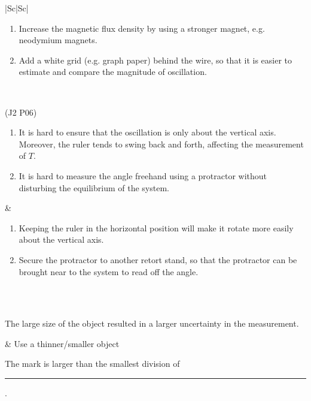 \documentclass[oneside]{book}
\begin{document}
\begin{itemize}
\begin{longtable}{|Sc|Sc|}
\begin{minipage}{0.5\textwidth-25.2pt}
            \begin{enumerate}
                \item Increase the magnetic flux density by using a stronger magnet, e.g. neodymium magnets.
                \item Add a white grid (e.g. graph paper) behind the wire, so that it is easier to estimate and compare the magnitude of oscillation.
            \end{enumerate}
        \end{minipage}\\
        \hline
        \begin{minipage}{0.5\textwidth-25.2pt}
            (J2 P06)
            \begin{enumerate}
                \item It is hard to ensure that the oscillation is only about the vertical axis. Moreover, the ruler tends to swing back and forth, affecting the measurement of \(T\).
                \item It is hard to measure the angle freehand using a protractor without disturbing the equilibrium of the system.
            \end{enumerate}
        \end{minipage}&
        \begin{minipage}{0.5\textwidth-25.2pt}
            \begin{enumerate}
                \item Keeping the ruler in the horizontal position will make it rotate more easily about the vertical axis.
                \item Secure the protractor to another retort stand, so that the protractor can be brought near to the system to read off the angle.
            \end{enumerate}
        \end{minipage}\\
        \hline
        \hline
        \\
        \hline
        \begin{minipage}{0.5\textwidth-25.2pt}
            The large size of the object resulted in a larger uncertainty in the measurement.
        \end{minipage}& 
        Use a thinner/smaller object\\
        \hline
        \begin{minipage}{0.5\textwidth-25.2pt}
            The mark is larger than the smallest division of \rule{0.5cm}{0.05mm}.

\end{minipage}
\end{longtable}
\end{itemize}
\end{document}
